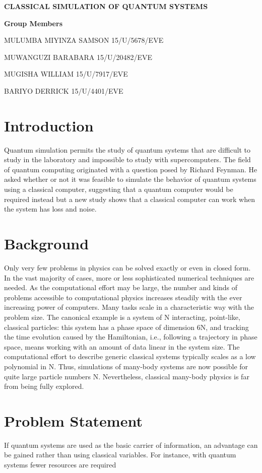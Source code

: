 \documentclass[options]{article}
\begin{document}
\begin{center}
\textbf{CLASSICAL SIMULATION OF QUANTUM SYSTEMS}

\textbf{Group Members}

MULUMBA MIYINZA SAMSON 15/U/5678/EVE

MUWANGUZI BARABARA 15/U/20482/EVE

MUGISHA WILLIAM 15/U/7917/EVE

BARIYO DERRICK   15/U/4401/EVE




\end{center}

\section{\textbf{ Introduction}}
Quantum simulation permits the study of quantum systems that are difficult to study in the laboratory and impossible to study with supercomputers.
The field of quantum computing originated with a question posed by Richard Feynman. He asked whether or not it was feasible to simulate the behavior of quantum systems using a classical computer, suggesting that a quantum computer would be required instead but a new study shows that a classical computer can work when the system has loss and noise.


\section{\textbf{ Background }}
Only very few problems in physics can be solved exactly or even in closed form. In the vast majority of cases, more or less sophisticated numerical techniques are needed. As the computational effort may be large, the number and kinds of problems accessible to computational physics increases steadily with the ever increasing power of computers. Many tasks scale in a characteristic way with the problem size. The canonical example is a system of N interacting, point-like, classical particles: this system has a phase space of dimension 6N, and tracking the time evolution caused by the Hamiltonian, i.e., following a trajectory in phase space, means working with an amount of data linear in the system size. The computational effort to describe generic classical systems typically scales as a low polynomial in N. Thus, simulations of many-body systems are now possible for quite large particle numbers N. Nevertheless, classical many-body physics is far from being fully explored.

\section{\textbf{ Problem Statement}}
If quantum systems are used as the basic carrier of information, an advantage can be gained rather than using classical variables. For instance, with quantum systems fewer resources are required
\end{document}
